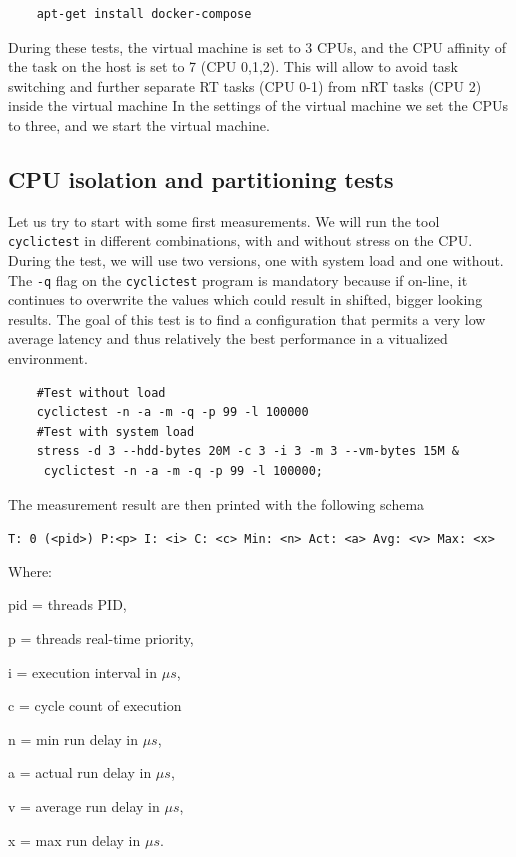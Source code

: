 \documentclass[]{scrartcl}
\begin{document}
\begin{verbatim}
	apt-get install docker-compose
\end{verbatim}

During these tests, the virtual machine is set to 3 CPUs, and the CPU affinity of the task on the host is set to 7 (CPU 0,1,2). This will allow to avoid task switching and further separate RT tasks (CPU 0-1) from nRT tasks (CPU 2) inside the virtual machine
In the settings of the virtual machine we set the CPUs to three, and we start the virtual machine.  
%
%

\subsection{CPU isolation and partitioning tests}

Let us try to start with some first measurements. We will run the tool \texttt{cyclictest} in different combinations, with and without stress on the CPU. During the test, we will use two versions, one with system load and one without. The \texttt{-q} flag on the \texttt{cyclictest} program is mandatory because if on-line, it continues to overwrite the values which could result in shifted, bigger looking results. The goal of this test is to find a configuration that permits a very low average latency and thus relatively the best performance in a vitualized environment.

\begin{verbatim}
	#Test without load
	cyclictest -n -a -m -q -p 99 -l 100000
	#Test with system load
	stress -d 3 --hdd-bytes 20M -c 3 -i 3 -m 3 --vm-bytes 15M &
	 cyclictest -n -a -m -q -p 99 -l 100000;
\end{verbatim}

The measurement result are then printed with the following schema
\bigskip

\noindent \small \texttt{T: 0 (<pid>) P:<p> I: <i> C: <c> Min: <n> Act: <a> Avg: <v> Max: <x>}
\bigskip

Where:
\begin{where}
	\item[pid =] threads PID,
	\item[p =] threads real-time priority,
	\item[i =] execution interval in $\mu s$,
	\item[c =] cycle count of execution
	\item[n =] min run delay in $\mu s$,
	\item[a =] actual run delay in $\mu s$,
	\item[v =] average run delay in $\mu s$,
	\item[x =] max run delay in $\mu s$.
\end{where} 
\end{document}
